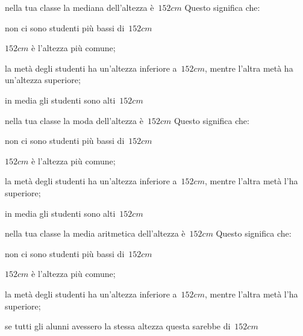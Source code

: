 \begin{esercizio}
\begin{enumerate*}
\begin{enumeratea}
 \end{enumeratea}
\item nella tua classe la mediana dell'altezza è~\(152\unit{cm}\) Questo 
significa che:
 \begin{enumeratea}
\item non ci sono studenti più bassi di~\(152\unit{cm}\)
\item \(152\unit{cm}\) è l'altezza più comune;
\item la metà degli studenti ha un'altezza inferiore a~\(152\unit{cm}\), 
mentre l'altra metà ha un'altezza superiore;
\item in media gli studenti sono alti~\(152\unit{cm}\)
 \end{enumeratea}
\item nella tua classe la moda dell'altezza è~\(152\unit{cm}\) Questo 
significa che:
 \begin{enumeratea}
\item non ci sono studenti più bassi di~\(152\unit{cm}\)
\item \(152\unit{cm}\) è l'altezza più comune;
\item la metà degli studenti ha un'altezza inferiore a~\(152\unit{cm}\), 
mentre l'altra metà l'ha superiore;
\item in media gli studenti sono alti~\(152\unit{cm}\)
 \end{enumeratea}
\item nella tua classe la media aritmetica dell'altezza è~\(152\unit{cm}\) 
Questo significa che:
 \begin{enumeratea}
\item non ci sono studenti più bassi di~\(152\unit{cm}\)
\item \(152\unit{cm}\) è l'altezza più comune;
\item la metà degli studenti ha un'altezza inferiore a~\(152\unit{cm}\), 
mentre l'altra metà l'ha superiore;
\item se tutti gli alunni avessero la stessa altezza questa sarebbe 
di~\(152\unit{cm}\)
 \end{enumeratea}

\end{enumerate*}
\end{esercizio}

